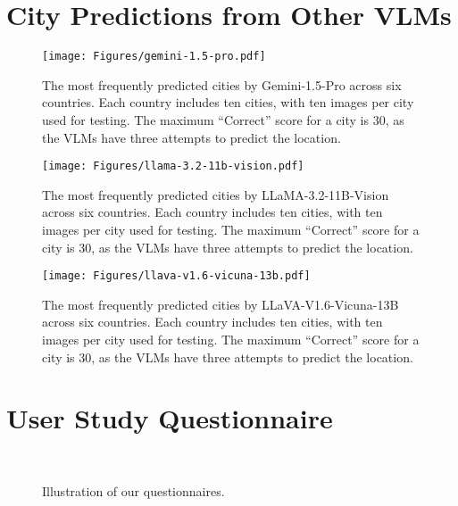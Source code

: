\onecolumn
\appendix

\section{City Predictions from Other VLMs}

\begin{figure*}[h!]
    \centering
    \texttt{[image: Figures/gemini-1.5-pro.pdf]}
    \caption{The most frequently predicted cities by Gemini-1.5-Pro across six countries. Each country includes ten cities, with ten images per city used for testing. The maximum ``Correct'' score for a city is 30, as the VLMs have three attempts to predict the location.}
    \label{fig:city-gemini}
\end{figure*}

\begin{figure*}[h!]
    \centering
    \texttt{[image: Figures/llama-3.2-11b-vision.pdf]}
    \caption{The most frequently predicted cities by LLaMA-3.2-11B-Vision across six countries. Each country includes ten cities, with ten images per city used for testing. The maximum ``Correct'' score for a city is 30, as the VLMs have three attempts to predict the location.}
    \label{fig:city-llama}
\end{figure*}

\begin{figure*}[h!]
    \centering
    \texttt{[image: Figures/llava-v1.6-vicuna-13b.pdf]}
    \caption{The most frequently predicted cities by LLaVA-V1.6-Vicuna-13B across six countries. Each country includes ten cities, with ten images per city used for testing. The maximum ``Correct'' score for a city is 30, as the VLMs have three attempts to predict the location.}
    \label{fig:city-llava}
\end{figure*}

\clearpage

\section{User Study Questionnaire}

\begin{figure}[h!]
  \centering
   \\
  \caption{Illustration of our questionnaires.}
    \label{fig:questionnaire}
\end{figure}